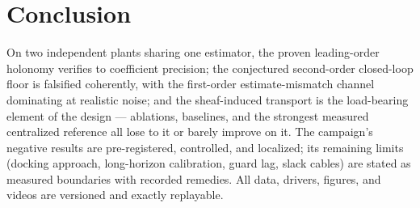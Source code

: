 \documentclass[letterpaper, 10pt, journal]{IEEEtran}
\begin{document}
\section{Conclusion}
On two independent plants sharing one estimator, the proven leading-order
holonomy verifies to coefficient precision; the conjectured second-order
closed-loop floor is falsified coherently, with the first-order
estimate-mismatch channel dominating at realistic noise; and the sheaf-induced
transport is the load-bearing element of the design --- ablations, baselines,
and the strongest measured centralized reference all lose to it or barely
improve on it. The campaign's negative results are pre-registered,
controlled, and localized; its remaining limits (docking approach, long-horizon
calibration, guard lag, slack cables) are stated as measured boundaries with
recorded remedies. All data, drivers, figures, and videos are versioned and
exactly replayable.



\end{document}
